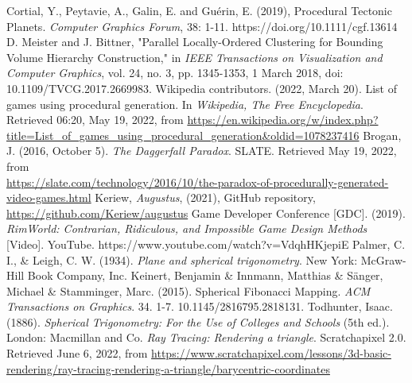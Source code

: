 \begin{thebibliography}{9}
Cortial, Y., Peytavie, A., Galin, E. and Guérin, E. (2019), Procedural Tectonic Planets. \textit{Computer Graphics Forum}, 38: 1-11. https://doi.org/10.1111/cgf.13614
D. Meister and J. Bittner, "Parallel Locally-Ordered Clustering for Bounding Volume Hierarchy Construction," in \textit{IEEE Transactions on Visualization and Computer Graphics}, vol. 24, no. 3, pp. 1345-1353, 1 March 2018, doi: 10.1109/TVCG.2017.2669983.
Wikipedia contributors. (2022, March 20). List of games using procedural generation. In \textit{Wikipedia, The Free Encyclopedia}. Retrieved 06:20, May 19, 2022, from \url{https://en.wikipedia.org/w/index.php?title=List\_of\_games\_using\_procedural\_generation\&oldid=1078237416}
Brogan, J. (2016, October 5). \textit{The Daggerfall Paradox}. SLATE. Retrieved May 19, 2022, from\\ \url{https://slate.com/technology/2016/10/the-paradox-of-procedurally-generated-video-games.html}
Keriew, \textit{Augustus}, (2021), GitHub repository, \url{https://github.com/Keriew/augustus}
Game Developer Conference [GDC]. (2019). \textit{RimWorld: Contrarian, Ridiculous, and Impossible Game Design Methods} [Video]. YouTube. https://www.youtube.com/watch?v=VdqhHKjepiE
Palmer, C. I., \& Leigh, C. W. (1934). \textit{Plane and spherical trigonometry}. New York: McGraw-Hill Book Company, Inc. 
Keinert, Benjamin  \& Innmann, Matthias \& Sänger, Michael \& Stamminger, Marc. (2015). Spherical Fibonacci Mapping. \textit{ACM Transactions on Graphics}. 34. 1-7. 10.1145/2816795.2818131. 
Todhunter, Isaac. (1886). \textit{Spherical Trigonometry: For the Use of Colleges and Schools} (5th ed.). London: Macmillan and Co.
\textit{Ray Tracing: Rendering a triangle}. Scratchapixel 2.0. Retrieved June 6, 2022, from \url{https://www.scratchapixel.com/lessons/3d-basic-rendering/ray-tracing-rendering-a-triangle/barycentric-coordinates }
\end{thebibliography}